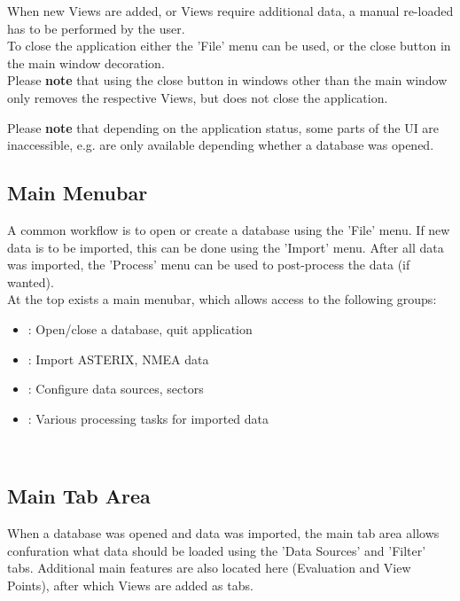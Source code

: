 When new Views are added, or Views require additional data, a manual re-loaded has to be performed by the user. \\

To close the application either the 'File' menu can be used, or the close button in the main window decoration. \\

Please \textbf{note} that using the close button in windows other than the main window only removes the respective Views, but does not close the application.

Please \textbf{note} that depending on the application status, some parts of the UI are inaccessible, e.g. are only available depending whether a database was opened.

\subsection{Main Menubar}

A common workflow is to open or create a database using the 'File' menu. If new data is to be imported, this can be done using the 'Import' menu. After all data was imported, the 'Process' menu can be used to post-process the data (if wanted). \\

At the top exists a main menubar, which allows access to the following groups:

\begin{itemize}
 \item {}: Open/close a database, quit application
 \item {}: Import ASTERIX, NMEA data
 \item {}: Configure data sources, sectors
 \item {}: Various processing tasks for imported data
\end{itemize}
\  \\

\subsection{Main Tab Area}

When a database was opened and data was imported, the main tab area allows confuration what data should be loaded using the 'Data Sources' and 'Filter' tabs. Additional main features are also located here (Evaluation and View Points), after which Views are added as tabs. \\

